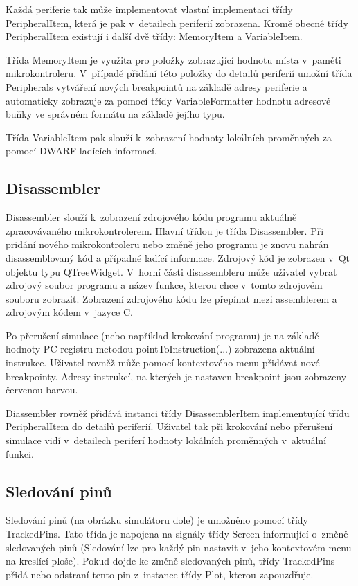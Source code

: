 Každá periferie tak může implementovat vlastní implementaci třídy PeripheralItem, která je pak v~detailech periferií zobrazena. Kromě obecné třídy PeripheralItem existují i další dvě třídy: MemoryItem a VariableItem.

Třída MemoryItem je využita pro položky zobrazující hodnotu místa v~paměti mikrokontroleru. V~případě přidání této položky do detailů periferií umožní třída Peripherals vytváření nových breakpointů na základě adresy periferie a automaticky zobrazuje za pomocí třídy VariableFormatter hodnotu adresové buňky ve správném formátu na základě jejího typu.

Třída VariableItem pak slouží k~zobrazení hodnoty lokálních proměnných za pomocí DWARF ladících informací.

\subsection{Disassembler}
\label{screen_disassembler}

Disassembler slouží k~zobrazení zdrojového kódu programu aktuálně zpracovávaného mikrokontrolerem. Hlavní třídou je třída Disassembler. Při pridání nového mikrokontroleru nebo změně jeho programu je znovu nahrán disassemblovaný kód a případné ladící informace. Zdrojový kód je zobrazen v~Qt objektu typu QTreeWidget. V~horní části disassembleru může uživatel vybrat zdrojový soubor programu a název funkce, kterou chce v~tomto zdrojovém souboru zobrazit. Zobrazení zdrojového kódu lze přepínat mezi assemblerem a zdrojovým kódem v~jazyce C.

Po přerušení simulace (nebo například krokování programu) je na základě hodnoty PC registru metodou pointToInstruction(...) zobrazena aktuální instrukce. Uživatel rovněž může pomocí kontextového menu přidávat nové breakpointy. Adresy instrukcí, na kterých je nastaven breakpoint jsou zobrazeny červenou barvou.

Diassembler rovněž přidává instanci třídy DisassemblerItem implementující třídu PeripheralItem do detailů periferií. Uživatel tak při krokování nebo přerušení simulace vidí v~detailech periferí hodnoty lokálních proměnných v~aktuální funkci.

\subsection{Sledování pinů}
\label{screen_tracking}

Sledování pinů (na obrázku simulátoru dole) je umožněno pomocí třídy TrackedPins. Tato třída je napojena na signály třídy Screen informující o~změně sledovaných pinů (Sledování lze pro každý pin nastavit v~jeho kontextovém menu na kreslící ploše). Pokud dojde ke změně sledovaných pinů, třídy TrackedPins přidá nebo odstraní tento pin z~instance třídy Plot, kterou zapouzdřuje.

